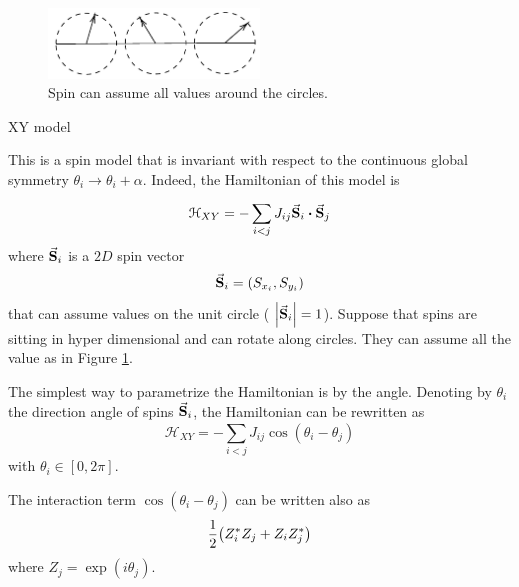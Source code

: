 \documentclass[../main/main.tex]{subfiles}
\begin{document}
\begin{figure}[h!]
\centering
\includegraphics[width=0.5\textwidth]{../lessons/10_image/2.pdf}
\caption{\label{fig:10_2} Spin can assume all values around the circles.}
\end{figure}

\begin{example}{XY model}{}


This is a spin model that is invariant with respect to the continuous global symmetry
\( \theta _i \rightarrow \theta _i + \alpha  \).
Indeed, the Hamiltonian of this model is
\begin{equation}
  \mathcal{H}_{XY} = - \sum_{i<j}^{} J_{ij} \va{S}_i \vdot \va{S}_j
\end{equation}
where \(\va{S}_i  \) is a \( 2D \) spin vector
\begin{equation*}
  \va{S}_i = (S_{x_i}, S_{y_i})
\end{equation*}
that can assume values on the unit circle ( \(  \abs{\va{S}_i} =1 \)).
Suppose that spins are sitting in hyper dimensional and can rotate along circles. They can assume all the value as in Figure \ref{fig:10_2}.

The simplest way to parametrize the Hamiltonian is by the angle.
Denoting by \( \theta _i \) the direction angle of spins \( \va{S}_i \), the Hamiltonian can be rewritten as
\begin{equation}
  \mathcal{H}_{XY} = - \sum_{i<j}^{} J_{ij} \cos(\theta _i - \theta _j)
\end{equation}
with \( \theta _i \in [0,2 \pi ] \).

\begin{remark}
The interaction term \( \cos(\theta _i - \theta _j)  \) can be written also as
\begin{equation*}
  \frac{1}{2} \qty(Z_i^* Z_j + Z_i Z_j^*)
\end{equation*}
where \(   Z_j = \exp (i \theta _j) \).
\end{remark}


\end{example}
\end{document}
